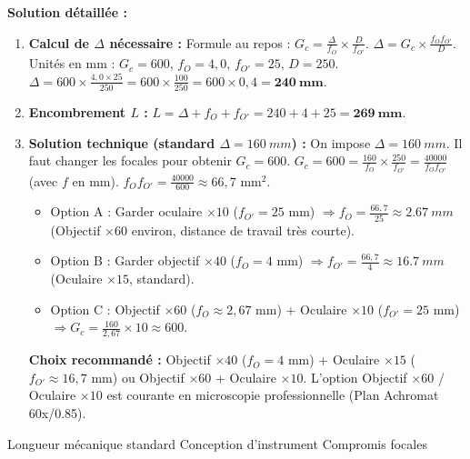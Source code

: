 \documentclass[11pt]{article}
\newcommand{\cle}[1]{{\popxbold\color{popdark}#1}}
\begin{document}
\begin{exoresolu}
\tcblower
\textbf{Solution détaillée :}
\begin{enumerate}
    \item \textbf{Calcul de $\Delta$ nécessaire :} Formule au repos : $G_c = \frac{\Delta}{f_O} \times \frac{D}{f_{O'}}$.
    $\Delta = G_c \times \frac{f_O f_{O'}}{D}$.
    Unités en mm : $G_c = 600$, $f_O = 4,0$, $f_{O'} = 25$, $D = 250$.
    $\Delta = 600 \times \frac{4,0 \times 25}{250} = 600 \times \frac{100}{250} = 600 \times 0,4 = \mathbf{\SI{240}{mm}}$.
    \item \textbf{Encombrement $L$ :} $L = \Delta + f_O + f_{O'} = 240 + 4 + 25 = \mathbf{\SI{269}{mm}}$.
    \item \textbf{Solution technique (standard $\Delta = \SI{160}{mm}$) :}
    On impose $\Delta = \SI{160}{mm}$. Il faut changer les focales pour obtenir $G_c = 600$.
    $G_c = 600 = \frac{160}{f_O} \times \frac{250}{f_{O'}} = \frac{40000}{f_O f_{O'}}$ (avec $f$ en mm).
    $f_O f_{O'} = \frac{40000}{600} \approx 66,7 \text{ mm}^2$.
    \begin{itemize}
        \item Option A : Garder oculaire $\times 10$ ($f_{O'}=25$ mm) $\Rightarrow f_O = \frac{66,7}{25} \approx \SI{2,67}{mm}$ (Objectif $\times 60$ environ, distance de travail très courte).
        \item Option B : Garder objectif $\times 40$ ($f_O=4$ mm) $\Rightarrow f_{O'} = \frac{66,7}{4} \approx \SI{16,7}{mm}$ (Oculaire $\times 15$, standard).
        \item Option C : Objectif $\times 60$ ($f_O \approx 2,67$ mm) + Oculaire $\times 10$ ($f_{O'}=25$ mm) $\Rightarrow G_c = \frac{160}{2,67} \times 10 \approx 600$.
    \end{itemize}
    \textbf{Choix recommandé :} Objectif $\times 40$ ($f_O=4$ mm) + Oculaire $\times 15$ ($f_{O'} \approx 16,7$ mm) ou Objectif $\times 60$ + Oculaire $\times 10$. L'option Objectif $\times 60$ / Oculaire $\times 10$ est courante en microscopie professionnelle (Plan Achromat 60x/0.85).
\end{enumerate}
\cle{Longueur mécanique standard} \cle{Conception d'instrument} \cle{Compromis focales}
\end{exoresolu}
\end{document}
